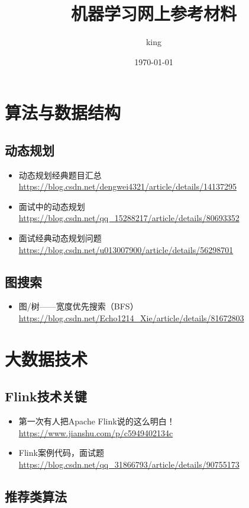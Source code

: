 \documentclass[11pt]{article}
\author{king}
\date{\today}
\title{机器学习网上参考材料}
\begin{document}
\maketitle
\tableofcontents


\section{算法与数据结构}
\label{sec-1}

\subsection{动态规划}
\label{sec-1-1}
\begin{itemize}
\item 动态规划经典题目汇总 \url{https://blog.csdn.net/dengwei4321/article/details/14137295}
\item 面试中的动态规划 \url{https://blog.csdn.net/qq_15288217/article/details/80693352}
\item 面试经典动态规划问题 \url{https://blog.csdn.net/u013007900/article/details/56298701}
\end{itemize}

\subsection{图搜索}
\label{sec-1-2}
\begin{itemize}
\item 图/树——宽度优先搜索（BFS）\url{https://blog.csdn.net/Echo1214_Xie/article/details/81672803}
\end{itemize}

\section{大数据技术}
\label{sec-2}

\subsection{Flink技术关键}
\label{sec-2-1}
\begin{itemize}
\item 第一次有人把Apache Flink说的这么明白！ \url{https://www.jianshu.com/p/c5949402134c}
\item Flink案例代码，面试题 \url{https://blog.csdn.net/qq_31866793/article/details/90755173}
\end{itemize}

\subsection{推荐类算法}
\label{sec-2-2}
\end{document}
